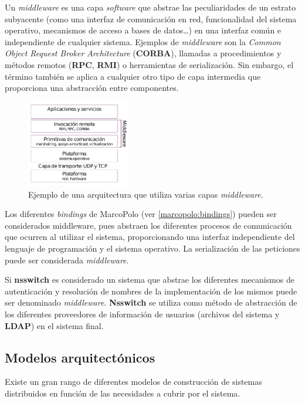 Un \textit{middleware} es una capa \textit{software} que abstrae las peculiaridades de un estrato subyacente (como una interfaz de comunicación en red, funcionalidad del sistema operativo, mecanismos de acceso a bases de datos\dots) en una interfaz común e independiente de cualquier sistema. Ejemplos de \textit{middleware} son la \textit{Common Object Request Broker Architecture} (\textbf{CORBA}), llamadas a procedimientos y métodos remotos (\textbf{RPC}, \textbf{RMI}) o herramientas de serialización. Sin embargo, el término también se aplica a cualquier otro tipo de capa intermedia que proporciona una abstracción entre componentes.

\begin{figure}[H]
\centering
\includegraphics[width=0.4\textwidth]{Chapter2/Figures/middleware-rodrigo}
\caption{Ejemplo de una arquitectura que utiliza varias capas \textit{middleware}.}
\label{fig:middleware-rodrigo}
\end{figure}

Los diferentes \textit{bindings} de MarcoPolo (ver \ref{marcopolo:bindings}) pueden ser considerados middleware, pues abstraen los diferentes procesos de comunicación que ocurren al utilizar el sistema, proporcionando una interfaz independiente del lenguaje de programación y el sistema operativo. La serialización de las peticiones puede ser considerada \textit{middleware}.

Si \textbf{nsswitch} \cite{nsswitch} es considerado un sistema que abstrae los diferentes mecanismos de autenticación y resolución de nombres de la implementación de los mismos puede ser denominado \textit{middleware}. \textbf{Nsswitch} se utiliza como método de abstracción de los diferentes proveedores de información de usuarios (archivos del sistema y \textbf{LDAP}) en el sistema final.

\subsection{Modelos arquitectónicos}

Existe un gran rango de diferentes modelos de construcción de sistemas distribuidos en función de las necesidades a cubrir por el sistema.

